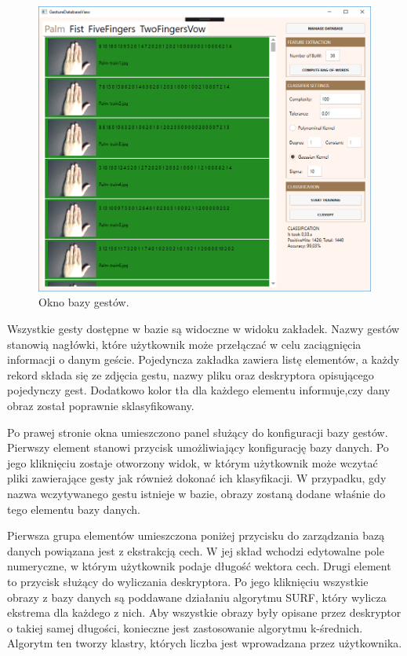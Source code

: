 \begin{figure}[h!]
	\centering
	\includegraphics[width=16cm]{DatabaseWidow}
	\centering
	\caption{Okno bazy gestów.}
	\label{im: DatabaseWidow}
\end{figure}

Wszystkie gesty dostępne w bazie są widoczne w widoku zakładek. Nazwy gestów stanowią nagłówki, które użytkownik może przełączać w celu zaciągnięcia informacji o danym geście. Pojedyncza zakładka zawiera listę elementów, a każdy rekord składa się ze zdjęcia gestu, nazwy pliku oraz deskryptora opisującego pojedynczy gest. Dodatkowo kolor tła dla każdego elementu informuje,czy dany obraz został poprawnie sklasyfikowany.

Po prawej stronie okna umieszczono panel służący do konfiguracji bazy gestów. Pierwszy element stanowi przycisk umożliwiający konfigurację bazy danych. Po jego kliknięciu zostaje otworzony widok, w którym użytkownik może wczytać pliki zawierające gesty jak również dokonać ich klasyfikacji. W przypadku, gdy nazwa wczytywanego gestu istnieje w bazie, obrazy zostaną dodane właśnie do tego elementu bazy danych. 

Pierwsza grupa elementów umieszczona poniżej przycisku do zarządzania bazą danych powiązana jest z ekstrakcją cech. W jej skład wchodzi edytowalne pole numeryczne, w którym użytkownik podaje długość wektora cech. Drugi element to przycisk służący do wyliczania deskryptora. Po jego kliknięciu wszystkie obrazy z bazy danych są poddawane działaniu algorytmu SURF, który wylicza ekstrema dla każdego z nich. Aby wszystkie obrazy były opisane przez deskryptor o takiej samej długości, konieczne jest zastosowanie algorytmu k-średnich. Algorytm ten tworzy klastry, których liczba jest wprowadzana przez użytkownika.

